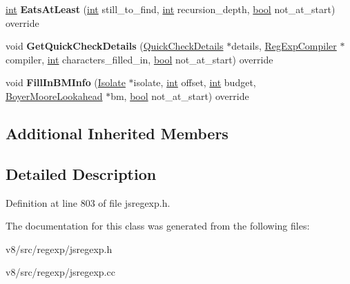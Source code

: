 \begin{DoxyCompactItemize}
\mbox{\hyperlink{classint}{int}} {\bfseries Eats\+At\+Least} (\mbox{\hyperlink{classint}{int}} still\+\_\+to\+\_\+find, \mbox{\hyperlink{classint}{int}} recursion\+\_\+depth, \mbox{\hyperlink{classbool}{bool}} not\+\_\+at\+\_\+start) override
\item 
\mbox{\label{classv8_1_1internal_1_1BackReferenceNode_a8e32a6380a981ec577f8551fff292e29}} 
void {\bfseries Get\+Quick\+Check\+Details} (\mbox{\hyperlink{classv8_1_1internal_1_1QuickCheckDetails}{Quick\+Check\+Details}} $\ast$details, \mbox{\hyperlink{classv8_1_1internal_1_1RegExpCompiler}{Reg\+Exp\+Compiler}} $\ast$compiler, \mbox{\hyperlink{classint}{int}} characters\+\_\+filled\+\_\+in, \mbox{\hyperlink{classbool}{bool}} not\+\_\+at\+\_\+start) override
\item 
\mbox{\label{classv8_1_1internal_1_1BackReferenceNode_a7248d52a3a8975462042f74fea36027e}} 
void {\bfseries Fill\+In\+B\+M\+Info} (\mbox{\hyperlink{classv8_1_1internal_1_1Isolate}{Isolate}} $\ast$isolate, \mbox{\hyperlink{classint}{int}} offset, \mbox{\hyperlink{classint}{int}} budget, \mbox{\hyperlink{classv8_1_1internal_1_1BoyerMooreLookahead}{Boyer\+Moore\+Lookahead}} $\ast$bm, \mbox{\hyperlink{classbool}{bool}} not\+\_\+at\+\_\+start) override
\end{DoxyCompactItemize}
\subsection*{Additional Inherited Members}


\subsection{Detailed Description}


Definition at line 803 of file jsregexp.\+h.



The documentation for this class was generated from the following files\+:\begin{DoxyCompactItemize}
\item 
v8/src/regexp/jsregexp.\+h\item 
v8/src/regexp/jsregexp.\+cc\end{DoxyCompactItemize}
